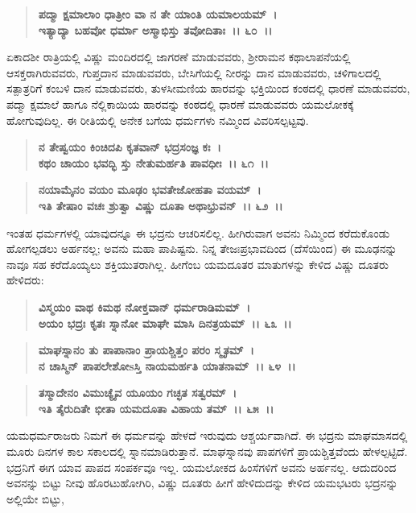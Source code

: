 \begin{verse}
\textbf{ಪದ್ಮಾ ಕ್ಷಮಾಲಾಂ ಧಾತ್ರೀಂ ವಾ ನ ತೇ ಯಾಂತಿ ಯಮಾಲಯಮ್~।}\\\textbf{ಇತ್ಯಾದ್ಯಾ ಬಹವೋ ಧರ್ಮಾ ಅಸ್ಮಾಭಿಸ್ತು ತವೋದಿತಾಃ~।। ೬೦~।।}
\end{verse}

ಏಕಾದಶೀ ರಾತ್ರಿಯಲ್ಲಿ ವಿಷ್ಣು ಮಂದಿರದಲ್ಲಿ ಜಾಗರಣೆ ಮಾಡುವವರು, ಶ‍್ರೀರಾಮನ ಕಥಾಲಾಪನೆಯಲ್ಲಿ ಆಸಕ್ತರಾಗಿರುವವರು, ಗುಪ್ತದಾನ ಮಾಡುವವರು, ಬೇಸಿಗೆಯಲ್ಲಿ ನೀರನ್ನು ದಾನ ಮಾಡುವವರು, ಚಳಿಗಾಲದಲ್ಲಿ ಸತ್ಪಾತ್ರರಿಗೆ ಕಂಬಳಿ ದಾನ ಮಾಡುವವರು, ತುಳಸೀಮಣಿಯ ಹಾರವನ್ನು ಭಕ್ತಿಯಿಂದ ಕಂಠದಲ್ಲಿ ಧಾರಣೆ ಮಾಡುವವರು, ಪದ್ಮಾ ಕ್ಷಮಾಲೆ ಹಾಗೂ ನೆಲ್ಲಿಕಾಯಿಯ ಹಾರವನ್ನು ಕಂಠದಲ್ಲಿ ಧಾರಣೆ ಮಾಡುವವರು ಯಮಲೋಕಕ್ಕೆ ಹೋಗುವುದಿಲ್ಲ. ಈ ರೀತಿಯಲ್ಲಿ ಅನೇಕ ಬಗೆಯ ಧರ್ಮಗಳು ನಮ್ಮಿಂದ ವಿವರಿಸಲ್ಪಟ್ಟವು.

\begin{verse}
\textbf{ನ ತೇಷ್ವಯಂ ಕಿಂಚಿದಪಿ ಕೃತವಾನ್ ಭದ್ರಸಂಜ್ಞ ಕಃ~।}\\\textbf{ಕಥಂ ಚಾಯಂ ಭವದ್ಭಿ ಸ್ತು ನೇತುಮರ್ಹತಿ ಪಾವಧೀಃ~।। ೬೧~।। }
\end{verse}

\begin{verse}
\textbf{ನಯಾಮೈನಂ ವಯಂ ಮೂಢಂ ಭವತೇಜೋಹತಾ ವಯಮ್~।}\\\textbf{ಇತಿ ತೇಷಾಂ ವಚಃ ಶ್ರುತ್ವಾ ವಿಷ್ಣು ದೂತಾ ಅಥಾಭ್ರುವನ್~।। ೬೨~।।}
\end{verse}

ಇಂತಹ ಧರ್ಮಗಳಲ್ಲಿ ಯಾವುದನ್ನೂ ಈ ಭದ್ರನು ಆಚರಿಸಲಿಲ್ಲ. ಹೀಗಿರುವಾಗ ಅವನು ನಿಮ್ಮಿಂದ ಕರೆದುಕೊಂಡು ಹೋಗಲ್ಪಡಲು ಅರ್ಹನಲ್ಲ; ಅವನು ಮಹಾ ಪಾಪಿಷ್ಟನು. ನಿನ್ನ ತೇಜಃಪ್ರಭಾವದಿಂದ (ದೆಸೆಯಿಂದ) ಈ ಮೂಢನನ್ನು ನಾವೂ ಸಹ ಕರೆದೊಯ್ಯಲು ಶಕ್ತಿಯುತರಾಗಿಲ್ಲ. ಹೀಗೆಂಬ ಯಮದೂತರ ಮಾತುಗಳನ್ನು ಕೇಳಿದ ವಿಷ್ಣು ದೂತರು ಹೇಳಿದರು:

\begin{verse}
\textbf{ವಿಸ್ಮಯಂ ವಾಥ ಕಿಮಥ ನೋಕ್ತವಾನ್ ಧರ್ಮರಾಡಿಮಮ್~।}\\\textbf{ಅಯಂ ಭದ್ರಃ ಕೃತಃ ಸ್ನಾನೋ ಮಾಘೇ ಮಾಸಿ ದಿನತ್ರಯಮ್~।। ೬೩~।। }
\end{verse}

\begin{verse}
\textbf{ಮಾಘಸ್ನಾನಂ ತು ಪಾಪಾನಾಂ ಪ್ರಾಯಶ್ಚಿತ್ತಂ ಪರಂ ಸ್ಮೃತಮ್~।}\\\textbf{ನ ಚಾಸ್ಮಿನ್ ಪಾಪಲೇಶೋsಸ್ತಿ ನಾಯಮರ್ಹತಿ ಯಾತನಾಮ್~।। ೬೪~।। }
\end{verse}

\begin{verse}
\textbf{ತಸ್ಮಾದೇನಂ ವಿಮುಚ್ಯೈವ ಯೂಯಂ ಗಚ್ಛತ ಸತ್ವರಮ್~।}\\\textbf{ಇತಿ ತೈರುದಿತೇ ಭೀತಾ ಯಮದೂತಾ ವಿಹಾಯ ತಮ್~।। ೬೫~।।}
\end{verse}

ಯಮಧರ್ಮರಾಜರು ನಿಮಗೆ ಈ ಧರ್ಮವನ್ನು ಹೇಳದೆ ಇರುವುದು ಆಶ್ಚರ್ಯವಾಗಿದೆ. ಈ ಭದ್ರನು ಮಾಘಮಾಸದಲ್ಲಿ ಮೂರು ದಿನಗಳ ಕಾಲ ಸಕಾಲದಲ್ಲಿ ಸ್ನಾನಮಾಡಿರುತ್ತಾನೆ. ಮಾಘಸ್ನಾನವು ಪಾಪಗಳಿಗೆ ಪ್ರಾಯಶ್ಚಿತ್ತವೆಂದು ಹೇಳಲ್ಪಟ್ಟಿದೆ. ಭದ್ರನಿಗೆ ಈಗ ಯಾವ ಪಾಪದ ಸಂಪರ್ಕವೂ ಇಲ್ಲ. ಯಮಲೋಕದ ಹಿಂಸೆಗಳಿಗೆ ಅವನು ಅರ್ಹನಲ್ಲ. ಆದುದರಿಂದ ಅವನನ್ನು ಬಿಟ್ಟು ನೀವು ಹೊರಟುಹೋಗಿರಿ, ವಿಷ್ಣು ದೂತರು ಹೀಗೆ ಹೇಳಿದುದನ್ನು ಕೇಳಿದ ಯಮಭಟರು ಭದ್ರನನ್ನು ಅಲ್ಲಿಯೇ ಬಿಟ್ಟು,

